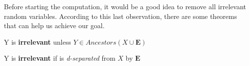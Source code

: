 Before starting the computation, it would be a good idea to remove all irrelevant random variables. According to this last observation,
there are some theorems that can help us achieve our goal.
\begin{definition}[title={Theorem}]
    Y is \textbf{irrelevant} unless $Y \in Ancestors({X} \cup \mathbf{E})$
\end{definition}
\begin{definition}[title={Theorem}]
    Y is \textbf{irrelevant} if is \textit{d-separated} from $X$ by $\mathbf{E}$
\end{definition}
\begin{example}
    
\end{example}